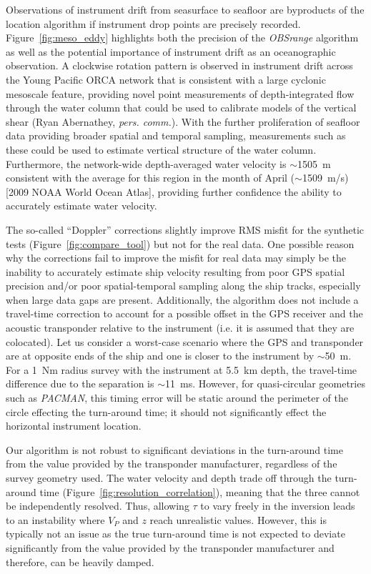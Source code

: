 Observations of instrument drift from seasurface to seafloor are byproducts of the location algorithm if instrument drop points are precisely recorded. Figure~\ref{fig:meso_eddy} highlights both the precision of the \textit{OBSrange} algorithm as well as the potential importance of instrument drift as an oceanographic observation. A clockwise rotation pattern is observed in instrument drift across the Young Pacific ORCA network that is consistent with a large cyclonic mesoscale feature, providing novel point measurements of depth-integrated flow through the water column that could be used to calibrate models of the vertical shear (Ryan Abernathey, \textit{pers. comm.}). With the further proliferation of seafloor data providing broader spatial and temporal sampling, measurements such as these could be used to estimate vertical structure of the water column. Furthermore, the network-wide depth-averaged water velocity is $\sim$1505~m consistent with the average for this region in the month of April ($\sim$1509~m/s) [2009 NOAA World Ocean Atlas], providing further confidence the ability to accurately estimate water velocity.

The so-called ``Doppler'' corrections slightly improve RMS misfit for the synthetic tests (Figure~\ref{fig:compare_tool}) but not for the real data. One possible reason why the corrections fail to improve the misfit for real data may simply be the inability to accurately estimate ship velocity resulting from poor GPS spatial precision and/or poor spatial-temporal sampling along the ship tracks, especially when large data gaps are present. Additionally, the algorithm does not include a travel-time correction to account for a possible offset in the GPS receiver and the acoustic transponder relative to the instrument (i.e. it is assumed that they are colocated). Let us consider a worst-case scenario where the GPS and transponder are at opposite ends of the ship and one is closer to the instrument by $\sim$50~m. For a 1~Nm radius survey with the instrument at 5.5~km depth, the travel-time difference due to the separation is $\sim$11~ms. However, for quasi-circular geometries such as \textit{PACMAN}, this timing error will be static around the perimeter of the circle effecting the turn-around time; it should not significantly effect the horizontal instrument location.

Our algorithm is not robust to significant deviations in the turn-around time from the value provided by the transponder manufacturer, regardless of the survey geometry used. The water velocity and depth trade off through the turn-around time (Figure~\ref{fig:resolution_correlation}), meaning that the three cannot be independently resolved. Thus, allowing $\tau$ to vary freely in the inversion leads to an instability where $V_P$ and $z$ reach unrealistic values. However, this is typically not an issue as the true turn-around time is not expected to deviate significantly from the value provided by the transponder manufacturer and therefore, can be heavily damped.